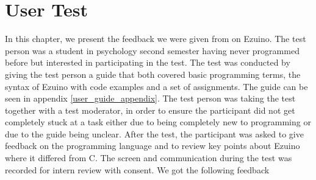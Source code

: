 \section{User Test}
In this chapter, we present the feedback we were given from on Ezuino. The test person was a student in psychology second semester having never programmed before but interested in participating in the test. The test was conducted by giving the test person a guide that both covered basic programming terms, the syntax of Ezuino with code examples and a set of assignments. The guide can be seen in appendix \ref{user_guide_appendix}. The test person was taking the test together with a test moderator, in order to ensure the participant did not get completely stuck at a task either due to being completely new to programming or due to the guide being unclear. After the test, the participant was asked to give feedback on the programming language and to review key points about Ezuino where it differed from C. The screen and communication during the test was recorded for intern review with consent.
We got the following feedback
